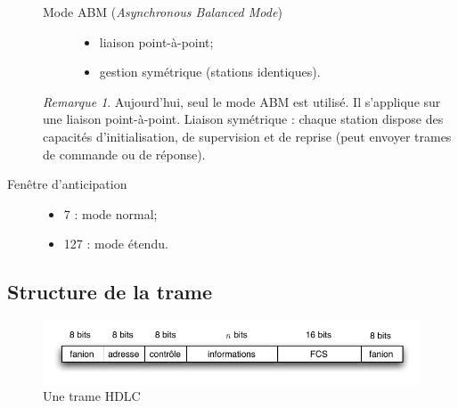 \documentclass[11pt,english,french]{scrreprt}
\theoremstyle{remark}
\newtheorem*{rem*}{Remarque}
\theoremstyle{definition}
\begin{document}
\begin{description}
\begin{description}
\begin{itemize}
		\end{itemize}
		\item [Mode ABM (\emph{Asynchronous Balanced Mode})] \hfill\begin{itemize}
			\item liaison point-à-point;
			\item gestion symétrique (stations identiques).
		\end{itemize}
	\end{description}
	\begin{rem*}
		Aujourd'hui, seul le mode ABM est utilisé. Il s'applique sur une liaison point-à-point. Liaison symétrique : chaque station dispose des capacités d'initialisation, de supervision et de reprise (peut envoyer trames de commande ou de réponse).
	\end{rem*}
	\item[Fenêtre d'anticipation] \hfill\begin{itemize}
		\item 7 : mode normal;
		\item 127 : mode étendu.
	\end{itemize}
\end{description}

\clearpage

\subsection{Structure de la trame} %

\begin{figure}[h!]
	\center
	\includegraphics[scale=.8]{graphes/trame}
	\caption{Une trame HDLC}
\end{figure}
\end{document}
